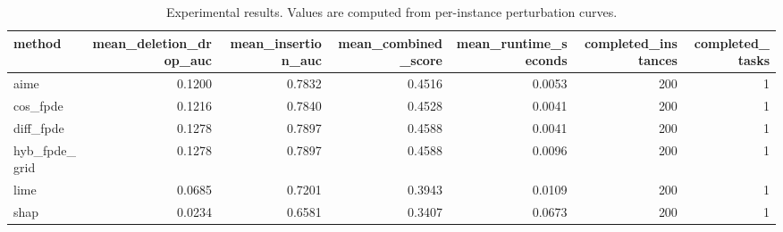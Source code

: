 \begin{table}[t]
\caption{Experimental results. Values are computed from per-instance perturbation curves.}
\label{tab:main_results_computed}
\centering
\begin{tabular}{lrrrrrr}
\toprule
method & mean\_deletion\_drop\_auc & mean\_insertion\_auc & mean\_combined\_score & mean\_runtime\_seconds & completed\_instances & completed\_tasks \\
\midrule
aime & 0.1200 & 0.7832 & 0.4516 & 0.0053 & 200 & 1 \\
cos\_fpde & 0.1216 & 0.7840 & 0.4528 & 0.0041 & 200 & 1 \\
diff\_fpde & 0.1278 & 0.7897 & 0.4588 & 0.0041 & 200 & 1 \\
hyb\_fpde\_grid & 0.1278 & 0.7897 & 0.4588 & 0.0096 & 200 & 1 \\
lime & 0.0685 & 0.7201 & 0.3943 & 0.0109 & 200 & 1 \\
shap & 0.0234 & 0.6581 & 0.3407 & 0.0673 & 200 & 1 \\
\bottomrule
\end{tabular}

\end{table}

